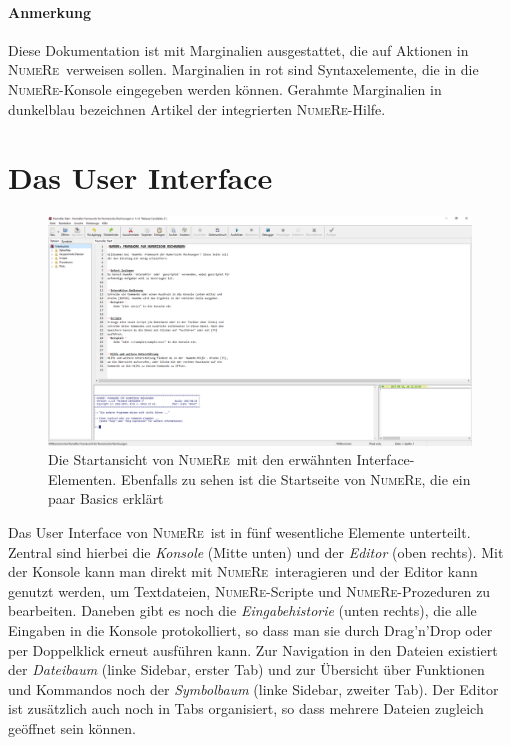 \documentclass[DIV=14,headsepline,footsepline]{scrbook}
\newcommand{\NR}{\textsc{Nu\-me\-Re}}
\begin{document}
			\paragraph{Anmerkung}
				Diese Dokumentation ist mit Marginalien ausgestattet, die auf Aktionen in \NR\ verweisen sollen. Marginalien in rot sind Syntaxelemente, die in die \NR-Konsole eingegeben werden können. Gerahmte Marginalien in dunkelblau bezeichnen Artikel der integrierten \NR-Hilfe.
			\section{Das User Interface}
				\begin{figure}[htb]%
					\centering
					\includegraphics[width=\textwidth]{_graphics/ui.png}
					\caption{Die Startansicht von \NR\ mit den erwähnten Interface-Elementen. Ebenfalls zu sehen ist die Startseite von \NR, die ein paar Basics erklärt}
					\label{fig:ui}
				\end{figure}	
				Das User Interface von \NR\ ist in fünf wesentliche Elemente unterteilt. Zentral sind hierbei die \emph{Konsole} (Mitte unten) und der \emph{Editor} (oben rechts). Mit der Konsole kann man direkt mit \NR\ interagieren und der Editor kann genutzt werden, um Textdateien, \NR-Scripte und \NR-Prozeduren zu bearbeiten. Daneben gibt es noch die \emph{Eingabehistorie} (unten rechts), die alle Eingaben in die Konsole protokolliert, so dass man sie durch Drag'n'Drop oder per Doppelklick erneut ausführen kann. Zur Navigation in den Dateien existiert der \emph{Dateibaum} (linke Sidebar, erster Tab) und zur Übersicht über Funktionen und Kommandos noch der \emph{Symbolbaum} (linke Sidebar, zweiter Tab). Der Editor ist zusätzlich auch noch in Tabs organisiert, so dass mehrere Dateien zugleich geöffnet sein können.
				
\end{document}
